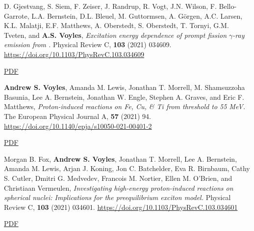 \begin{bibsection}

\item D. Gjestvang, S. Siem, F. Zeiser, J. Randrup, R. Vogt, J.N. Wilson, F. Bello-Garrote, L.A. Bernstein, D.L. Bleuel, M. Guttormsen, A. Görgen, A.C. Larsen, K.L. Malatji, E.F. Matthews, A. Oberstedt, S. Oberstedt, T. Tornyi, G.M. Tveten, and \textbf{A.S. Voyles}, \emph{Excitation energy dependence of prompt fission $\gamma$-ray emission from  .} Physical Review C, \textbf{103} (2021) 034609. \\\url{https://doi.org/10.1103/PhysRevC.103.034609} 

\ifshort \vspace{0.1cm} \href{https://avoyles.github.io/papers/Gjestvang2021_241Pu.pdf}{\underline{PDF}} \else  \fi 


\item \textbf{Andrew S. Voyles}, Amanda M. Lewis, Jonathan T. Morrell, M. Shamsuzzoha Basunia, Lee A. Bernstein, Jonathan W. Engle, Stephen A. Graves, and Eric F. Matthews, \emph{Proton-induced reactions on Fe, Cu, \& Ti from threshold to 55 MeV.} The European Physical Journal A, \textbf{57} (2021) 94. \\\url{https://doi.org/10.1140/epja/s10050-021-00401-2} 

\ifshort \vspace{0.1cm} \href{https://avoyles.github.io/papers/Voyles2021_Fe_px.pdf}{\underline{PDF}} \else  \fi 


\item Morgan B. Fox, \textbf{Andrew S. Voyles}, Jonathan T. Morrell, Lee A. Bernstein, Amanda M. Lewis, Arjan J. Koning, Jon C. Batchelder, Eva R. Birnbaum, Cathy S. Cutler, Dmitri G. Medvedev, Francois M. Nortier, Ellen M. O’Brien, and Christiaan Vermeulen, \emph{Investigating high-energy proton-induced reactions on spherical nuclei: Implications for the preequilibrium exciton model.} Physical Review C, \textbf{103} (2021) 034601. \url{https://doi.org/10.1103/PhysRevC.103.034601} 

\ifshort \vspace{0.1cm} \href{https://avoyles.github.io/papers/Fox2021_Nb.pdf}{\underline{PDF}} \else  \fi 



\end{bibsection}
